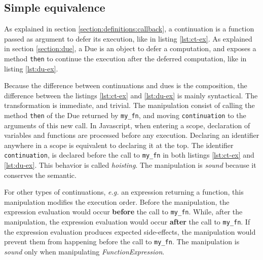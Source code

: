
\subsection{Simple equivalence} \label{section:equivalences:general}

As explained in section \ref{section:definitions:callback}, a continuation is a function passed as argument to defer its execution, like in listing \ref{lst:ct-ex}.
As explained in section \ref{section:due}, a Due is an object to defer a computation, and exposes a method \texttt{then} to continue the execution after the deferred computation, like in listing \ref{lst:du-ex}.

Because the difference between continuations and dues is the composition, the difference between the listings \ref{lst:ct-ex} and \ref{lst:du-ex} is mainly syntactical.
The transformation is immediate, and trivial.
The manipulation consist of calling the method \texttt{then} of the Due returned by \texttt{my_fn}, and moving \texttt{continuation} to the arguments of this new call.
In Javascript, when entering a scope, declaration of variables and functions are processed before any execution.
Declaring an identifier anywhere in a scope is equivalent to declaring it at the top.
The identifier \texttt{continuation}, is declared before the call to \texttt{my_fn} in both listings \ref{lst:ct-ex} and \ref{lst:du-ex}.
This behavior is called \textit{hoisting}.
The manipulation is \textit{sound} because it conserves the semantic.%

For other types of continuations, \textit{e.g.} an expression returning a function, this manipulation modifies the execution order.
Before the manipulation, the expression evaluation would occur \textbf{before} the call to \texttt{my_fn}.
While, after the manipulation, the expression evaluation would occur \textbf{after} the call to \texttt{my_fn}.
If the expression evaluation produces expected side-effects, the manipulation would prevent them from happening before the call to \texttt{my_fn}.
The manipulation is \textit{sound} only when manipulating \textit{FunctionExpression}.

